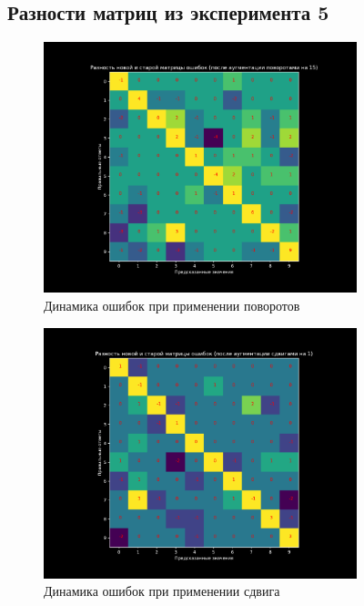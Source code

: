 \documentclass{article}
\begin{document}
\begin{figure}[H]
    \subsection{Разности матриц из эксперимента 5}
        \begin{figure}[H]
            \centering
            \includegraphics[width=0.8\linewidth]{./pictures/ConfusionDifferenceRotate5.pdf}
            \caption{Динамика ошибок при применении поворотов}
            \label{fig:mpr}
        \end{figure}
        \begin{figure}[H]
            \centering
            \includegraphics[width=0.8\linewidth]{./pictures/ConfusionDifferenceShift5.pdf}
            \caption{Динамика ошибок при применении сдвига}
            \label{fig:mpr}
        \end{figure}
        \begin{figure}[H]
            \centering

\end{figure}
\end{figure}
\end{document}

